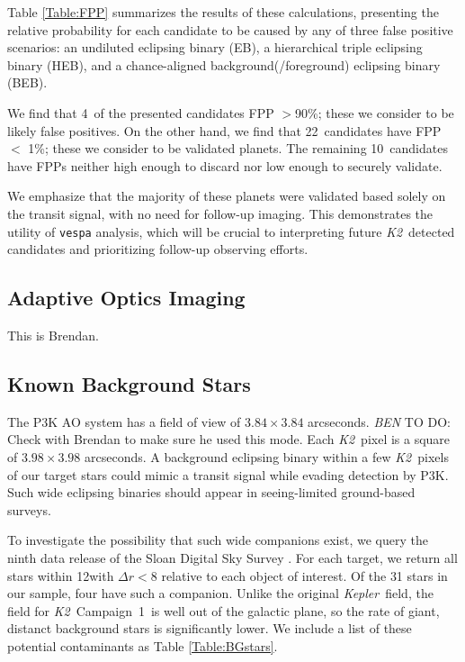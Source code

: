 \documentclass{emulateapj}
\newcommand{\project}[1]{\textsl{#1}}
\newcommand{\kep}{\project{Kepler}}
\newcommand{\KT}{\project{K2}}
\newcommand{\Ci}{Campaign~1}
\newcommand{\todo}[3]{{\color{#2} \emph{#1} TO DO: #3}}
\newcommand{\btmtodo}[1]{\todo{BEN}{red}{#1}}
\newcommand{\Nfp}{4}
\newcommand{\Nvalidated}{22}
\newcommand{\Nlimbo}{10} %
\begin{document}
Table \ref{Table:FPP} summarizes the results of these
calculations, presenting the relative probability for each candidate
to be caused by any of three false positive scenarios: an undiluted
eclipsing binary (EB), a hierarchical triple eclipsing binary (HEB),
and a chance-aligned background(/foreground) eclipsing binary (BEB).

We find that \Nfp\ of the presented candidates FPP $>$90\%;
these we consider to be likely false positives.
On the other hand, we find that \Nvalidated\ candidates
have FPP $<$ 1\%; these we consider to be validated planets.
The remaining \Nlimbo\ candidates have FPPs neither high enough to discard
nor low enough to securely validate.

We emphasize that the majority of these planets were validated based 
solely on the transit signal, with no need for follow-up imaging.  This
demonstrates the utility of \texttt{vespa} analysis, which will be
crucial to interpreting future \KT\ detected candidates and prioritizing
follow-up observing efforts.

\subsection{Adaptive Optics Imaging}

This is Brendan.




\subsection{Known Background Stars}
The P3K AO system has a field of view of $3.84 \times 3.84$ arcseconds.
\btmtodo{Check with Brendan to make sure he used this mode}.
Each \KT\ pixel is a square of $3.98 \times 3.98$ arcseconds.
A background eclipsing binary within a few \KT\ pixels of our target
stars could mimic a transit signal while evading detection by P3K.
Such wide eclipsing binaries should appear in seeing-limited ground-based
surveys.

To investigate the possibility that such wide companions exist,
we query the ninth data release of the Sloan Digital Sky Survey
\citep[SDSS DR9,][]{Ahn12}.
For each target, we return
all stars within 12\arcsec with $\Delta r < 8$ relative to each object
of interest.
Of the 31 stars in our sample, four have such a companion.
Unlike the original \kep\ field, the field for \KT\ \Ci\ is
well out of the galactic plane, so the rate of giant, distanct background
stars is significantly lower.
We include a list of these potential contaminants as Table
\ref{Table:BGstars}.
\end{document}
